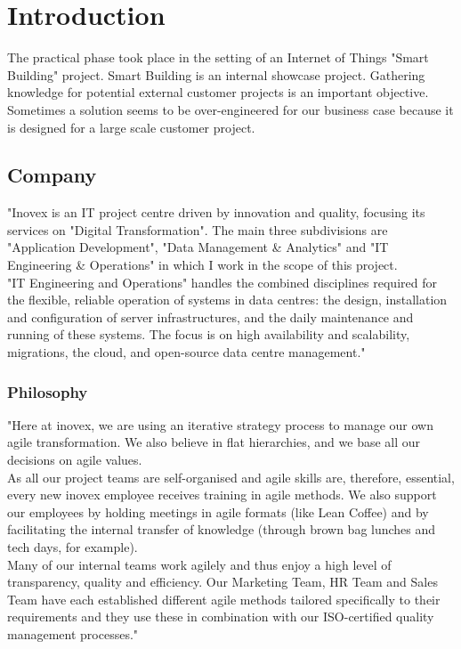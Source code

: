 \section{Introduction}
The practical phase took place in the setting of an Internet of Things "Smart Building" project. Smart Building is an internal showcase project. Gathering knowledge for potential external customer projects is an important objective. Sometimes a solution seems to be over-engineered for our business case because it is designed for a large scale customer project.

\subsection{Company}
"Inovex is an IT project centre driven by innovation and quality, focusing its services on "Digital Transformation". The main three subdivisions are "Application Development", "Data Management \& Analytics" and "IT Engineering \& Operations" in which I work in the scope of this project.\\
"IT Engineering and Operations" handles the combined disciplines required for the flexible, reliable operation of systems in data centres: the design, installation and configuration of server infrastructures, and the daily maintenance and running of these systems. The focus is on high availability and scalability, migrations, the cloud, and open-source data centre management."\cite{inovex}

\subsubsection{Philosophy}
"Here at inovex, we are using an iterative strategy process to manage our own agile transformation. We also believe in flat hierarchies, and we base all our decisions on agile values.\\
As all our project teams are self-organised and agile skills are, therefore, essential, every new inovex employee receives training in agile methods. We also support our employees by holding meetings in agile formats (like Lean Coffee) and by facilitating the internal transfer of knowledge (through brown bag lunches and tech days, for example).\\
Many of our internal teams work agilely and thus enjoy a high level of transparency, quality and efficiency. Our Marketing Team, HR Team and Sales Team have each established different agile methods tailored specifically to their requirements and they use these in combination with our ISO-certified quality management processes."\cite{inovex}

